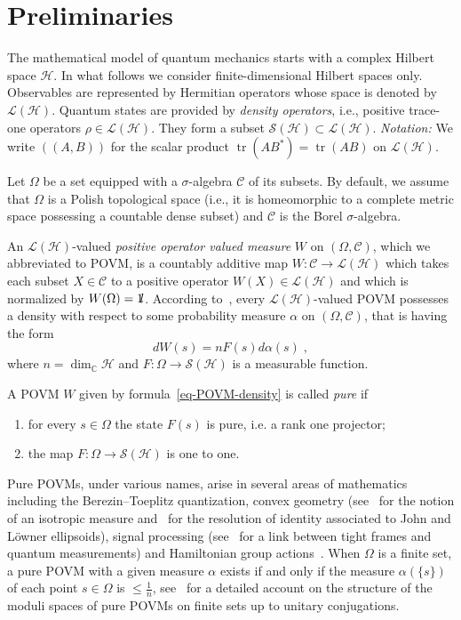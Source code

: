 \documentclass[11pt]{article}
\theoremstyle{definition}
\numberwithin{equation}{section}
\numberwithin{figure}{section}
\numberwithin{table}{section}
\DeclareMathOperator{\tr}{tr}
\newcommand{\CCC}{{\mathbb{C}}}
\newcommand{\cS}{{\mathcal{S}}}
\newcommand*\id{{1\hskip-2.5pt{\rm l}}}
\newcommand{\Hilb}{\mathcal{H}}
\renewcommand\leq {\leqslant}
\newcommand\< {\mathcal{h}}
\renewcommand\> {\mathcal{i}}
\newcommand*\cC{\mathscr{C}}
\newcommand*\cL{\mathscr{L}}
\newcommand*{\romanenumi}{\renewcommand*{\theenumi}{\roman{enumi}}}
\begin{document}
\section{Preliminaries}\label{prel}
The mathematical model of quantum mechanics starts with a complex Hilbert space $\Hilb$. In what follows we consider finite-dimensional Hilbert spaces only. Observables are represented by Hermitian operators whose space is denoted by $\cL(\Hilb)$. Quantum states are provided by \emph{density operators}, i.e., positive trace-one operators $\rho \in \cL(\Hilb)$. They form a subset $\cS(\Hilb) \subset \cL(\Hilb)$.
\emph{Notation:} We write $((A,B))$ for the scalar product $\tr(AB^*)= \tr(AB)$ on $\cL(\Hilb)$.

Let $\Omega$ be a set equipped with a $\sigma$-algebra $\cC$ of its subsets. By default, we assume that $\Omega$ is a Polish topological space (i.e., it is homeomorphic to a complete metric space possessing a countable dense subset) and $\cC$ is the Borel $\sigma$-algebra.

An $\cL(\Hilb)$-valued \emph{positive operator valued measure} $W$ on $(\Omega,\cC)$, which we abbreviated to POVM, is a countably additive map $W\colon \cC \to \cL(\Hilb)$ which takes each subset $X \in \cC$ to a positive operator $W(X) \in \cL(\Hilb)$ and which is normalized by $W(\Omega) = \id$. According to~\cite{CDS}, every $\cL(\Hilb)$-valued POVM possesses a density with respect to some probability measure $\alpha$ on $(\Omega, \cC)$, that is having the form
\begin{equation}\label{eq-POVM-density}
dW(s) = nF(s) d\alpha(s)\;,
\end{equation}
where $n= \dim_{\CCC} \Hilb$ and $F: \Omega \to \cS(\Hilb)$ is a measurable function.

A POVM $W$ given by formula~\eqref{eq-POVM-density} is called \emph{pure} if
\begin{enumerate}\romanenumi
\item \label{list2.1}for every $s \in \Omega$ the state $F(s)$ is pure, i.e. a rank one projector;
\item \label{list2.2}the map $F:\Omega \to \cS(\Hilb)$ is one to one.
\end{enumerate}
Pure POVMs, under various names, arise in several areas of mathematics including the Berezin--Toeplitz quantization, convex geometry (see~\cite{GM} for the notion of an isotropic measure and~\cite{AS} for the resolution of identity associated to John and L\"owner ellipsoids), signal processing (see~\cite{EF} for a link between tight frames and quantum measurements) and Hamiltonian group actions~\cite{FM}. When $\Omega$ is a finite set, a pure POVM with a given measure $\alpha$ exists if and only if the measure $\alpha(\{s\})$ of each point $s \in \Omega$ is $\leq \frac{1}{n}$, see~\cite{FM} for a detailed account on the structure of the moduli spaces of pure POVMs on finite sets up to unitary conjugations.
\end{document}
